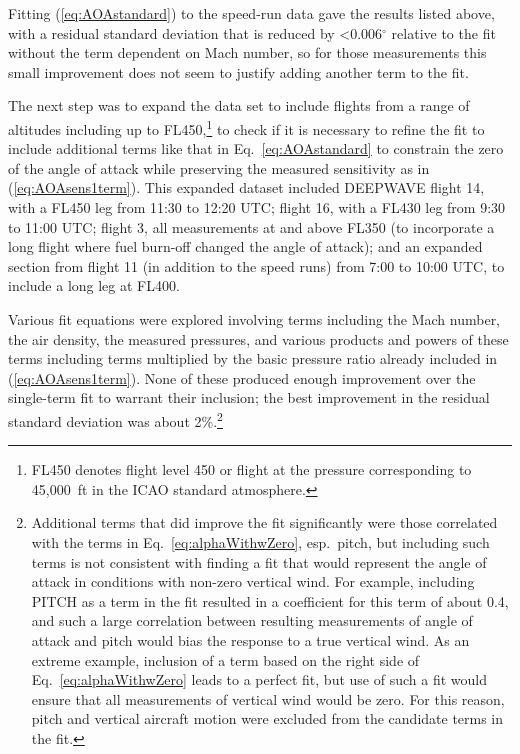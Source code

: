 \documentclass[12pt,twoside,english]{article}\usepackage[]{graphicx}\usepackage[]{color}
\begin{document}
Fitting (\ref{eq:AOAstandard}) to the speed-run data gave the results listed above, with a residual standard deviation that is reduced by <0.006$^{\circ}$ relative to the fit without the term dependent on Mach number, so for those measurements this small improvement does not seem to justify adding another term to the fit. %



The next step was to expand the data set to include flights from a range of altitudes including up to FL450,\footnote{FL450 denotes flight level 450 or flight at the pressure corresponding to 45,000~ft in the ICAO standard atmosphere.} to check if it is necessary to refine the fit to include additional terms like that in Eq.~\ref{eq:AOAstandard} to constrain the zero of the angle of attack while preserving the measured sensitivity as in (\ref{eq:AOAsens1term}). This expanded dataset included DEEPWAVE flight 14, with a FL450 leg from 11:30 to 12:20 UTC; flight 16, with a FL430 leg from 9:30 to 11:00 UTC; flight 3, all measurements at and above FL350 (to incorporate a long flight where fuel burn-off changed the angle of attack); and an expanded section from flight 11 (in addition to the speed runs) from 7:00 to 10:00 UTC, to include a long leg at FL400. 

Various fit equations were explored involving terms including the Mach number, the air density, the measured pressures, and various products and powers of these terms including terms multiplied by the basic pressure ratio already included in (\ref{eq:AOAsens1term}). None of these produced enough improvement over the single-term fit to warrant their inclusion; the best improvement in the residual standard deviation was about 2\%.\footnote{Additional terms that did improve the fit significantly were those correlated with the terms in Eq.~\ref{eq:alphaWithwZero}, esp.~pitch, but including such terms is not consistent with finding a fit that would represent the angle of attack in conditions with non-zero vertical wind. For example, including \textquotedbl{}PITCH\textquotedbl{} as a term in the fit resulted in a coefficient for this term of about 0.4, and such a large correlation between resulting measurements of angle of attack and pitch would bias the response to a true vertical wind. As an extreme example, inclusion of a term based on the right side of Eq.~\ref{eq:alphaWithwZero} leads to a perfect fit, but use of such a fit would ensure that all measurements of vertical wind would be zero. For this reason, pitch and vertical aircraft motion were excluded from the candidate terms in the fit.} 
\end{document}
